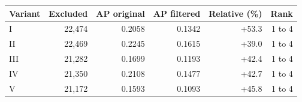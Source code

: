 \begin{tabular}{@{}lrrrrr@{}}
\toprule
Variant & Excluded & AP original & AP filtered & Relative (\%) & Rank \\
\midrule
I & 22,474 & 0.2058 & 0.1342 & +53.3 & 1 to 4 \\
II & 22,469 & 0.2245 & 0.1615 & +39.0 & 1 to 4 \\
III & 21,282 & 0.1699 & 0.1193 & +42.4 & 1 to 4 \\
IV & 21,350 & 0.2108 & 0.1477 & +42.7 & 1 to 4 \\
V & 21,172 & 0.1593 & 0.1093 & +45.8 & 1 to 4 \\
\bottomrule
\end{tabular}
